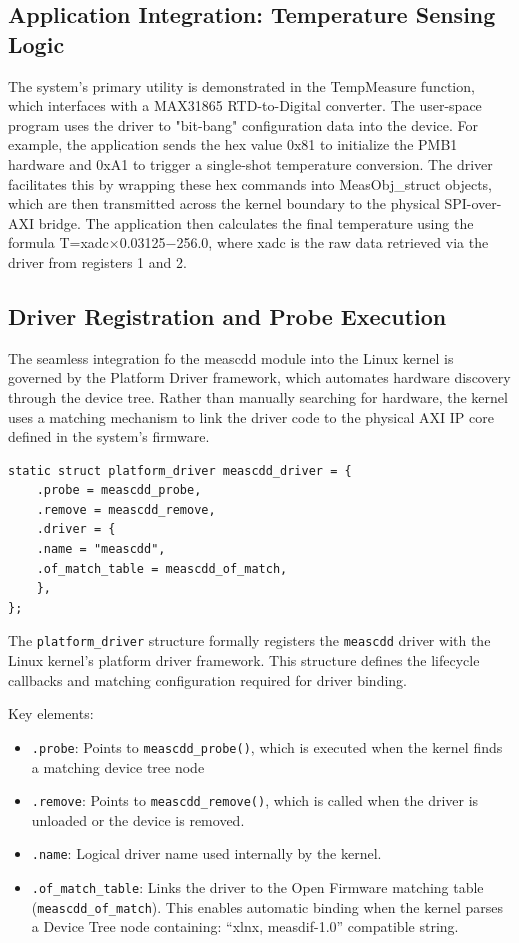 \subsection{Application Integration: Temperature Sensing Logic}
The system's primary utility is demonstrated in the TempMeasure function, which interfaces with a MAX31865 RTD-to-Digital converter. The user-space program uses the driver to "bit-bang" configuration data into the device.
For example, the application sends the hex value 0x81 to initialize the PMB1 hardware and 0xA1 to trigger a single-shot temperature conversion. The driver facilitates this by wrapping these hex commands into MeasObj\_struct objects, which are then transmitted across the kernel boundary to the physical SPI-over-AXI bridge. The application then calculates the final temperature using the formula T=xadc×0.03125−256.0, where xadc is the raw data retrieved via the driver from registers 1 and 2.

\subsection{Driver Registration and Probe Execution}
The seamless integration fo the meascdd module into the Linux kernel is governed by the Platform Driver framework, which automates hardware discovery through the device tree. Rather than manually searching for hardware, the kernel uses a matching mechanism to link the driver code to the physical AXI IP core defined in the system’s firmware. 

\begin{verbatim}
static struct platform_driver meascdd_driver = {
    .probe = meascdd_probe,
    .remove = meascdd_remove,
    .driver = {
    .name = "meascdd",
    .of_match_table = meascdd_of_match,
    },
};
\end{verbatim}

The \texttt{platform\_driver} structure formally registers the \texttt{meascdd} driver with the Linux kernel’s platform driver framework. This structure defines the lifecycle callbacks and matching configuration required for driver binding.

Key elements:
\begin{itemize}
    \item \texttt{.probe}: Points to \texttt{meascdd\_probe()}, which is executed when the kernel finds a matching device tree node
    \item \texttt{.remove}: Points to \texttt{meascdd\_remove()}, which is called when the driver is unloaded or the device is removed.
    \item \texttt{.name}: Logical driver name used internally by the kernel.
    \item \texttt{.of\_match\_table}: Links the driver to the Open Firmware matching table (\texttt{meascdd\_of\_match}). This enables automatic binding when the kernel parses a Device Tree node containing: “xlnx, measdif-1.0” compatible string.
\end{itemize}

